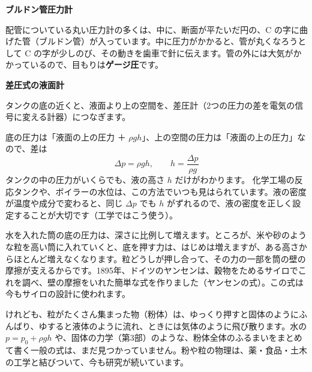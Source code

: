 \noindent\textbf{ブルドン管圧力計}\par\nobreak
配管についている丸い圧力計の多くは、中に、断面が平たいだ円の、C の字に曲げた管（ブルドン管）が入っています。中に圧力がかかると、管が丸くなろうとして C の字が少しのび、その動きを歯車で針に伝えます。管の外には大気がかかっているので、目もりは\textbf{ゲージ圧}です。

\noindent\textbf{差圧式の液面計}\par\nobreak
\noindent\begin{minipage}[c]{0.44\linewidth}\centering
{}
\end{minipage}\hfill
\begin{minipage}[c]{0.53\linewidth}\raggedright
タンクの底の近くと、液面より上の空間を、差圧計（2つの圧力の差を電気の信号に変える計器）につなぎます。
\end{minipage}
\par\vspace{3pt}
底の圧力は「液面の上の圧力 ＋ $\rho gh$」、上の空間の圧力は「液面の上の圧力」なので、差は
\[ \Delta p=\rho gh,\qquad h=\frac{\Delta p}{\rho g} \]
タンクの中の圧力がいくらでも、液の高さ $h$ だけがわかります。
\label{ph:力-12:sasatsu}化学工場の反応タンクや、ボイラーの水位は、この方法でいつも見はられています。液の密度が温度や成分で変わると、同じ $\Delta p$ でも $h$ がずれるので、液の密度を正しく設定することが大切です（工学ではこう使う）。

\begin{phmada}[砂や粉の圧力]
水を入れた筒の底の圧力は、深さに比例して増えます。ところが、米や砂のような粒を高い筒に入れていくと、底を押す力は、はじめは増えますが、ある高さからほとんど増えなくなります。粒どうしが押し合って、その力の一部を筒の壁の摩擦が支えるからです。1895年、ドイツのヤンセンは、穀物をためるサイロでこれを調べ、壁の摩擦をいれた簡単な式を作りました（ヤンセンの式）。この式は今もサイロの設計に使われます。

けれども、粒がたくさん集まった物（粉体）は、ゆっくり押すと固体のようにふんばり、ゆすると液体のように流れ、ときには気体のように飛び散ります。水の $p=p_0+\rho gh$ や、固体の力学（第3部）のような、粉体全体のふるまいをまとめて書く一般の式は、まだ見つかっていません。粉や粒の物理は、薬・食品・土木の工学と結びついて、今も研究が続いています。
\end{phmada}

